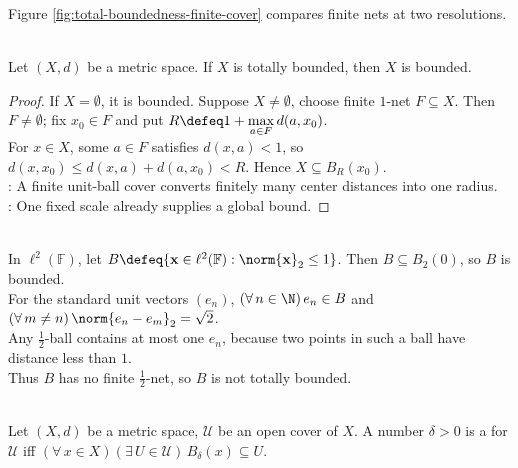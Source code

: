 Figure \ref{fig:total-boundedness-finite-cover} compares finite nets at two resolutions.
\begin{illustrationfigure}[H]
  \centering
  
  \caption{Dots mark a finite $\varepsilon$-net (left) and finer $\delta$-net (right); their balls cover $E$, with $0<\delta<\varepsilon$.}
  \label{fig:total-boundedness-finite-cover}
\end{illustrationfigure}

\begin{theorem} \label{thm:total-bounded-implies-bounded} \\
Let $(X,d)$ be a metric space. If $X$ is totally bounded, then $X$ is bounded.
\begin{proof}
If $X=\emptyset$, it is bounded. Suppose $X\ne\emptyset$, choose finite $1$-net $F\subseteq X$. Then $F\ne\emptyset$; fix $x_0\in F$ and put $R\defeq1+\max\limits_{a\in F}d(a,x_0)$.\\
For $x\in X$, some $a\in F$ satisfies $d(x,a)<1$, so $d(x,x_0)\leq d(x,a)+d(a,x_0)<R$. Hence $X\subseteq B_R(x_0)$.\\
: A finite unit-ball cover converts finitely many center distances into one radius.\\
: One fixed scale already supplies a global bound.
\end{proof}
\end{theorem}

\begin{counterexample} \label{cex:l2-closed-unit-ball-bounded-not-totally-bounded} \\
In $\ell^2(\mathbb{F})$, let $B\defeq\{\mathbf{x}\in\ell^2(\mathbb{F}):\norm{\mathbf{x}}_2\leq1\}$. Then $B\subseteq B_2(0)$, so $B$ is bounded.\\
For the standard unit vectors $(e_n)$, $(\forall\,n\in\N)\,e_n\in B$ and $(\forall\,m\ne n)\,\norm{e_n-e_m}_2=\sqrt{2}$.\\
Any $\frac{1}{2}$-ball contains at most one $e_n$, because two points in such a ball have distance less than $1$.\\
Thus $B$ has no finite $\frac{1}{2}$-net, so $B$ is not totally bounded.
\end{counterexample}

\begin{definition} \label{def:lebesgue-number-open-cover} \\
Let $(X,d)$ be a metric space, $\mathcal{U}$ be an open cover of $X$. A number $\delta>0$ is a  for $\mathcal{U}$ iff $(\forall\,x\in X)(\exists\,U\in\mathcal{U})\,B_\delta(x)\subseteq U$.
\end{definition}

